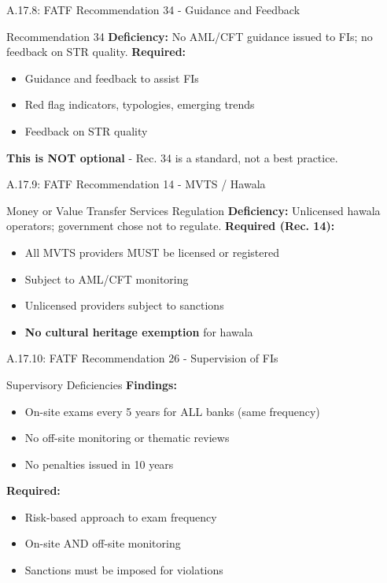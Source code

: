 \documentclass{beamer}
\begin{document}
\begin{frame}{A.17.8: FATF Recommendation 34 - Guidance and Feedback}
	\begin{block}{Recommendation 34}
		\textbf{Deficiency:} No AML/CFT guidance issued to FIs; no feedback on STR quality.
		\vspace{0.2cm}
		\textbf{Required:}
		\begin{itemize}
			\item Guidance and feedback to assist FIs
			\item Red flag indicators, typologies, emerging trends
			\item Feedback on STR quality
		\end{itemize}
		\textbf{This is NOT optional} - Rec. 34 is a standard, not a best practice.
	\end{block}
\end{frame}

\begin{frame}{A.17.9: FATF Recommendation 14 - MVTS / Hawala}
	\begin{block}{Money or Value Transfer Services Regulation}
		\textbf{Deficiency:} Unlicensed hawala operators; government chose not to regulate.
		\vspace{0.2cm}
		\textbf{Required (Rec. 14):}
		\begin{itemize}
			\item All MVTS providers MUST be licensed or registered
			\item Subject to AML/CFT monitoring
			\item Unlicensed providers subject to sanctions
			\item \textbf{No cultural heritage exemption} for hawala
		\end{itemize}
	\end{block}
\end{frame}

\begin{frame}{A.17.10: FATF Recommendation 26 - Supervision of FIs}
	\begin{block}{Supervisory Deficiencies}
		\textbf{Findings:}
		\begin{itemize}
			\item On-site exams every 5 years for ALL banks (same frequency)
			\item No off-site monitoring or thematic reviews
			\item No penalties issued in 10 years
		\end{itemize}
		\textbf{Required:}
		\begin{itemize}
			\item Risk-based approach to exam frequency
			\item On-site AND off-site monitoring
			\item Sanctions must be imposed for violations
		\end{itemize}
	\end{block}
\end{frame}
\end{document}
